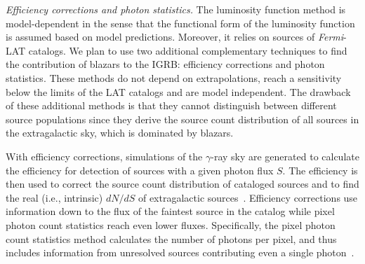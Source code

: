 \documentclass[12 pt]{article}
\begin{document}


{\it Efficiency corrections and photon statistics.}
The luminosity function method is model-dependent in the sense that the functional form of the luminosity function is assumed based on model predictions.
Moreover, it relies on sources of {\it Fermi}-LAT catalogs. We plan to use two additional complementary techniques to find the contribution of blazars to the IGRB: efficiency corrections and photon statistics.
These methods do not depend on extrapolations, reach a sensitivity below the limits of the LAT catalogs and are model independent.
The drawback of these additional methods is that they cannot distinguish between different source populations since they derive the source count distribution of all sources in the extragalactic sky, which is dominated by blazars.

With efficiency corrections, simulations of the $\gamma$-ray sky are generated to calculate the efficiency for detection of sources with a given photon flux $S$. 
The efficiency is then used to correct the source count distribution of cataloged sources and to find the real (i.e., intrinsic) $dN/dS$ of extragalactic sources~\cite{TheFermi-LAT:2015ykq}.
Efficiency corrections use information down to the flux of the faintest source in the catalog while pixel photon count statistics reach even lower fluxes.
Specifically, the pixel photon count statistics method calculates the number of photons per pixel, and thus includes information from unresolved sources contributing even a single photon~\cite{TheFermi-LAT:2015ykq}.
\end{document}
